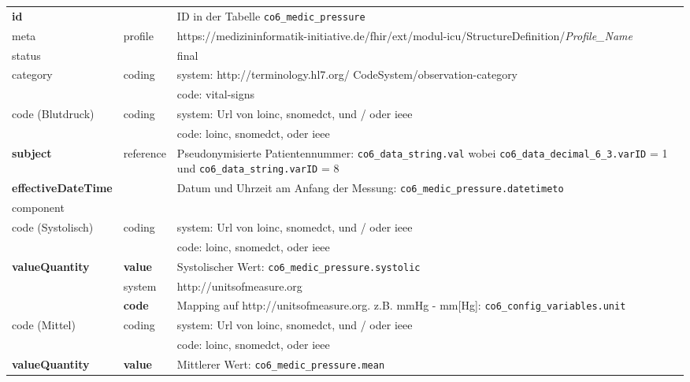 \begin{longtable}{|l|l|p{7cm}|} 
	\hline
	\rowcolor{lightgray} \multicolumn{3}{|l|}{Data Mapping (inhaltlich) - Blutdruckmessungen} \\ \hline
	\textbf{id} &  & ID in der Tabelle \texttt{co6\_medic\_pressure}  \\ \hline
	meta & profile & https://medizininformatik-initiative.de/fhir/ext/modul-icu/StructureDefinition/\textsl{Profile\_Name} \\ \hline 
	status &  & final  \\ \hline 
	category & coding & system: http://terminology.hl7.org/ CodeSystem/observation-category \\ 
	\cline{3-3}
	& & code: vital-signs \\ \hline
	code (Blutdruck) & coding & system: Url von \ac{loinc}, \ac{snomedct}, und / oder \ac{ieee} \\ 
	\cline{3-3} 
	&  & code: \ac{loinc}, \ac{snomedct}, oder \ac{ieee} \\ \hline
	\textbf{subject} & reference & Pseudonymisierte Patientennummer: \texttt{co6\_data\_string.val} wobei \texttt{co6\_data\_decimal\_6\_3.varID} = 1 und \texttt{co6\_data\_string.varID} = 8 \\ \hline
	\textbf{effectiveDateTime} & & Datum und Uhrzeit am Anfang der Messung:  \texttt{co6\_medic\_pressure.datetimeto} \\ \hline
	\multicolumn{3}{|l|}{component} \\ \hline
	code (Systolisch)  & coding & system: Url von \ac{loinc}, \ac{snomedct}, und / oder \ac{ieee} \\ 
	\cline{3-3} 
	&  & code: \ac{loinc}, \ac{snomedct}, oder \ac{ieee} \\ \hline	
	\textbf{valueQuantity} & \textbf{value} & Systolischer Wert: \texttt{co6\_medic\_pressure.systolic} \\
	\cline{2-3}
	& system & http://unitsofmeasure.org \\ 
	\cline{2-3}
	& \textbf{code} & Mapping auf http://unitsofmeasure.org. z.B. mmHg - mm[Hg]: \texttt{co6\_config\_variables.unit} \\ \hline
	code (Mittel)  & coding & system: Url von \ac{loinc}, \ac{snomedct}, und / oder \ac{ieee} \\ 
	\cline{3-3} 
	&  & code: \ac{loinc}, \ac{snomedct}, oder \ac{ieee} \\ \hline	
	\textbf{valueQuantity} & \textbf{value} & Mittlerer Wert: \texttt{co6\_medic\_pressure.mean} \\

\end{longtable}
